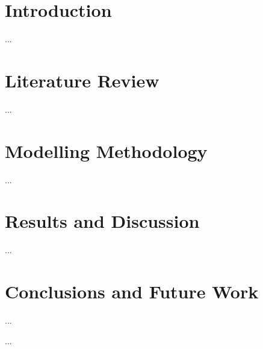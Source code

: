 \documentclass[12pt,oneside]{book} %
\begin{document}
\doublespacing
\FloatBarrier
\chapter{Introduction}\label{sec:intro}

...


\FloatBarrier
\chapter{Literature Review}\label{sec:overview}

...
 
\FloatBarrier
\chapter{Modelling Methodology}\label{sec:methods}

...


\FloatBarrier
\chapter{Results and Discussion}\label{sec:results}

...


\FloatBarrier
\chapter{Conclusions and Future Work}\label{sec:conclusions}

...


%
\renewcommand{\bibname}{References}  %



\FloatBarrier
\printbibliography

\FloatBarrier
\appendix


...
\end{document}
